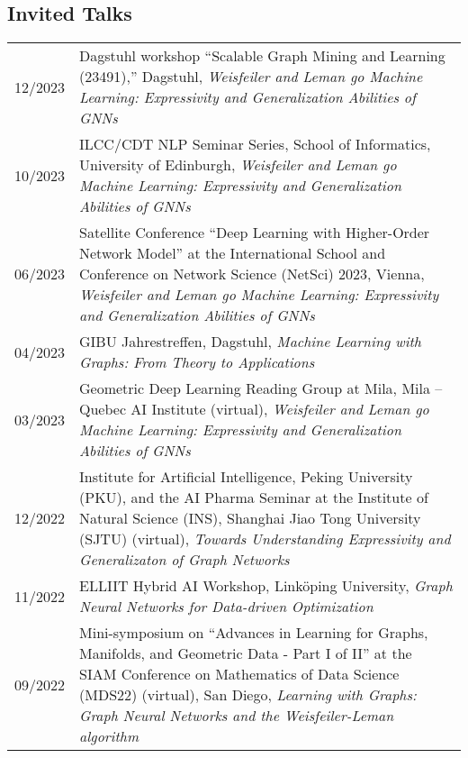 \documentclass[10pt, a4paper, DIV=14, headings=small]{scrartcl}
\begin{document}
\subsection*{Invited Talks}
\begin{longtabu}{p{2.1cm}p{12.0cm}}
	
	12/2023 & Dagstuhl workshop ``Scalable Graph Mining and Learning (23491),'' Dagstuhl, \emph{Weisfeiler and Leman go Machine Learning: Expressivity and Generalization Abilities of GNNs}                                                                                                \\
	10/2023 & ILCC/CDT NLP Seminar Series, School of Informatics, University of Edinburgh, \emph{Weisfeiler and Leman go Machine Learning: Expressivity and Generalization Abilities of GNNs}\\    
	06/2023 & Satellite Conference ``Deep Learning with Higher-Order Network Model'' at the International School
	and Conference on Network Science (NetSci) 2023, Vienna, \emph{Weisfeiler and Leman go Machine Learning: Expressivity and Generalization Abilities of GNNs}\\                                                                                                                     
	04/2023 & GIBU Jahrestreffen, Dagstuhl, \emph{Machine Learning with Graphs: From Theory to Applications}                                                                                                                                                                                \\
	03/2023 & Geometric Deep Learning Reading Group at Mila, Mila -- Quebec AI Institute (virtual), \emph{Weisfeiler and Leman go Machine Learning: Expressivity and Generalization Abilities of GNNs}\\
	12/2022 & Institute for Artificial Intelligence, Peking University (PKU), and the AI Pharma Seminar at the Institute of Natural Science (INS), Shanghai Jiao Tong University (SJTU) (virtual), \emph{Towards Understanding Expressivity and Generalizaton of Graph Networks}            \\
	11/2022 & ELLIIT Hybrid AI Workshop, Linköping University, \emph{Graph Neural Networks for Data-driven Optimization}                                                                                                                                                                    \\
	09/2022 & Mini-symposium on ``Advances in Learning for Graphs, Manifolds, and Geometric Data - Part I of II'' at the SIAM Conference on Mathematics of Data Science (MDS22) (virtual), San Diego, \emph{Learning with Graphs: Graph Neural Networks and the Weisfeiler-Leman algorithm} \\

\end{longtabu}
\end{document}
